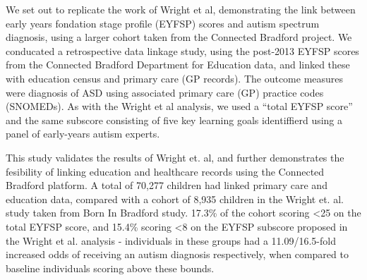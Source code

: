 
We set out to replicate the work of Wright et al, demonstrating the link between early years fondation stage profile (EYFSP) scores and autism spectrum diagnosis, using a larger cohort taken from the Connected Bradford project. We conducated a retrospective data linkage study, using the post-2013 EYFSP scores from the Connected Bradford Department for Education data, and linked these with education census and primary care (GP records). The outcome measures were diagnosis of ASD using associated primary care (GP) practice codes (SNOMEDs). As with the Wright et al analysis, we used a ``total EYFSP score'' and the same subscore consisting of five key learning goals identiffierd using a panel of early-years autism experts.

This study validates the results of Wright et. al, and further demonstrates the fesibility of linking education and healthcare records using the Connected Bradford platform. A total of 70,277 children had linked primary care and education data, compared with a cohort of 8,935 children in the Wright et. al. study taken from Born In Bradford study. 17.3\% of the cohort scoring \textless 25 on the total EYFSP score, and 15.4\% scoring \textless 8 on the EYFSP subscore proposed in the Wright et al. analysis - individuals in these groups had a 11.09/16.5-fold increased odds of receiving an autism diagnosis respectively, when compared to baseline individuals scoring above these bounds.

\newpage
